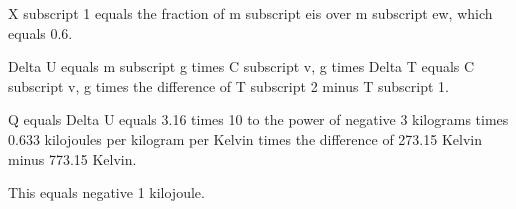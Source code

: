 X subscript 1 equals the fraction of m subscript eis over m subscript ew, which equals 0.6.

Delta U equals m subscript g times C subscript v, g times Delta T equals C subscript v, g times the difference of T subscript 2 minus T subscript 1.

Q equals Delta U equals 3.16 times 10 to the power of negative 3 kilograms times 0.633 kilojoules per kilogram per Kelvin times the difference of 273.15 Kelvin minus 773.15 Kelvin.

This equals negative 1 kilojoule.